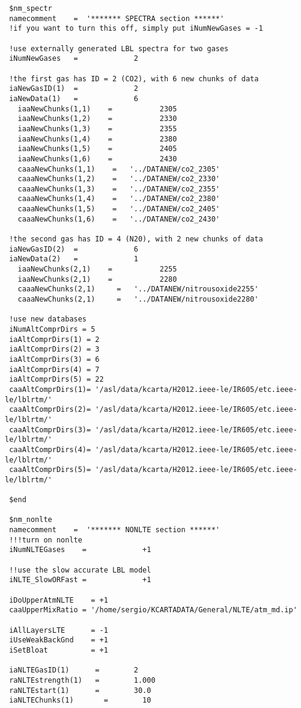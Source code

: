 \documentclass[12pt]{article}
\begin{document}
\begin{scriptsize}
\begin{verbatim}
 $nm_spectr
 namecomment    =  '******* SPECTRA section ******'
 !if you want to turn this off, simply put iNumNewGases = -1

 !use externally generated LBL spectra for two gases
 iNumNewGases   =             2

 !the first gas has ID = 2 (CO2), with 6 new chunks of data
 iaNewGasID(1)  =             2
 iaNewData(1)   =             6
   iaaNewChunks(1,1)    =           2305
   iaaNewChunks(1,2)    =           2330
   iaaNewChunks(1,3)    =           2355
   iaaNewChunks(1,4)    =           2380
   iaaNewChunks(1,5)    =           2405
   iaaNewChunks(1,6)    =           2430
   caaaNewChunks(1,1)    =   '../DATANEW/co2_2305'
   caaaNewChunks(1,2)    =   '../DATANEW/co2_2330'
   caaaNewChunks(1,3)    =   '../DATANEW/co2_2355'
   caaaNewChunks(1,4)    =   '../DATANEW/co2_2380'
   caaaNewChunks(1,5)    =   '../DATANEW/co2_2405'
   caaaNewChunks(1,6)    =   '../DATANEW/co2_2430'

 !the second gas has ID = 4 (N20), with 2 new chunks of data
 iaNewGasID(2)  =             6
 iaNewData(2)   =             1
   iaaNewChunks(2,1)    =           2255
   iaaNewChunks(2,1)    =           2280
   caaaNewChunks(2,1)     =   '../DATANEW/nitrousoxide2255'
   caaaNewChunks(2,1)     =   '../DATANEW/nitrousoxide2280'

 !use new databases
 iNumAltComprDirs = 5
 iaAltComprDirs(1) = 2
 iaAltComprDirs(2) = 3
 iaAltComprDirs(3) = 6
 iaAltComprDirs(4) = 7
 iaAltComprDirs(5) = 22
 caaAltComprDirs(1)= '/asl/data/kcarta/H2012.ieee-le/IR605/etc.ieee-le/lblrtm/'
 caaAltComprDirs(2)= '/asl/data/kcarta/H2012.ieee-le/IR605/etc.ieee-le/lblrtm/'
 caaAltComprDirs(3)= '/asl/data/kcarta/H2012.ieee-le/IR605/etc.ieee-le/lblrtm/'
 caaAltComprDirs(4)= '/asl/data/kcarta/H2012.ieee-le/IR605/etc.ieee-le/lblrtm/'
 caaAltComprDirs(5)= '/asl/data/kcarta/H2012.ieee-le/IR605/etc.ieee-le/lblrtm/'

 $end

 $nm_nonlte 
 namecomment    =  '******* NONLTE section ******' 
 !!!turn on nonlte
 iNumNLTEGases    =             +1 

 !!use the slow accurate LBL model
 iNLTE_SlowORFast =             +1

 iDoUpperAtmNLTE    = +1
 caaUpperMixRatio = '/home/sergio/KCARTADATA/General/NLTE/atm_md.ip'

 iAllLayersLTE      = -1
 iUseWeakBackGnd    = +1
 iSetBloat          = +1

 iaNLTEGasID(1)      =        2
 raNLTEstrength(1)   =        1.000
 raNLTEstart(1)      =        30.0
 iaNLTEChunks(1)       =        10


\end{verbatim}
\end{scriptsize}
\end{document}
